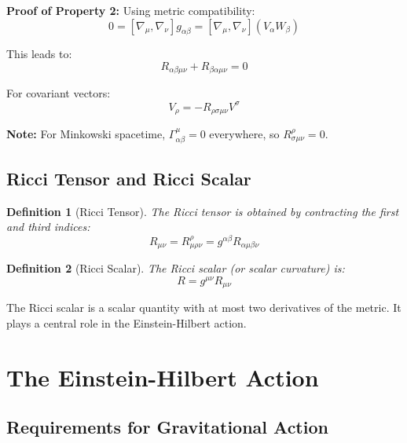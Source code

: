 \documentclass[11pt,a4paper]{article}
\newtheorem{definition}{Definition}
\begin{document}
\textbf{Proof of Property 2:}
Using metric compatibility:
\begin{equation}
0 = [\nabla_\mu, \nabla_\nu] g_{\alpha\beta} = [\nabla_\mu, \nabla_\nu] (V_\alpha W_\beta)
\end{equation}

This leads to:
\begin{equation}
R_{\alpha\beta\mu\nu} + R_{\beta\alpha\mu\nu} = 0
\end{equation}

For covariant vectors:
\begin{equation}
[\nabla_\mu, \nabla_\nu] V_\rho = -R_{\rho\sigma\mu\nu} V^\sigma
\end{equation}

\textbf{Note:} For Minkowski spacetime, $\Gamma^\mu_{\alpha\beta} = 0$ everywhere, so $R^\rho_{\sigma\mu\nu} = 0$.

\subsection{Ricci Tensor and Ricci Scalar}

\begin{definition}[Ricci Tensor]
The Ricci tensor is obtained by contracting the first and third indices:
\begin{equation}
R_{\mu\nu} = R^\rho_{\mu\rho\nu} = g^{\alpha\beta} R_{\alpha\mu\beta\nu}
\end{equation}
\end{definition}

\begin{definition}[Ricci Scalar]
The Ricci scalar (or scalar curvature) is:
\begin{equation}
R = g^{\mu\nu} R_{\mu\nu}
\end{equation}
\end{definition}

The Ricci scalar is a scalar quantity with at most two derivatives of the metric. It plays a central role in the Einstein-Hilbert action.

\section{The Einstein-Hilbert Action}

\subsection{Requirements for Gravitational Action}
\end{document}
